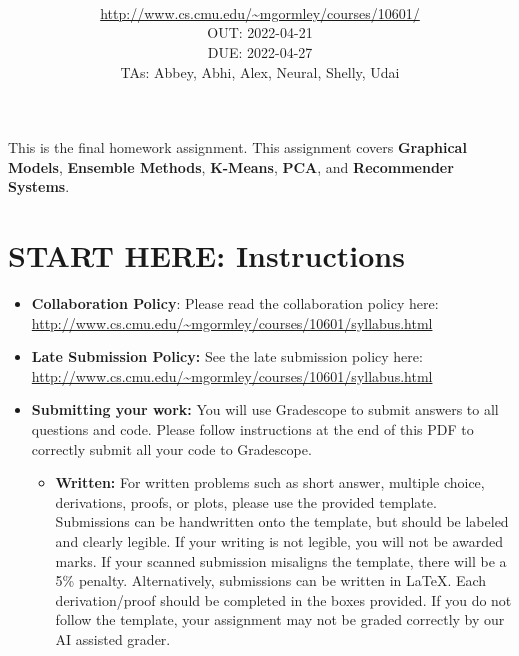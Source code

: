 \documentclass[11pt,addpoints,answers]{exam}
\title{\textsc{\hwName}
} %
\author{\courseName\\
\url{http://www.cs.cmu.edu/~mgormley/courses/10601/} \\
OUT:  2022-04-21 \\
DUE:  2022-04-27 \\ 
TAs: Abbey, Abhi, Alex, Neural, Shelly, Udai
}
\date{}
\date{}
\begin{document}
\maketitle

\begin{notebox}
This is the final homework assignment. This assignment covers \textbf{Graphical Models}, \textbf{Ensemble Methods}, \textbf{K-Means}, \textbf{PCA}, and \textbf{Recommender Systems}.
\end{notebox}
\newcommand \maxsubs {10 }
\section*{START HERE: Instructions}
\begin{itemize}

\item \textbf{Collaboration Policy}: Please read the collaboration policy here: \url{http://www.cs.cmu.edu/~mgormley/courses/10601/syllabus.html}

\item\textbf{Late Submission Policy:} See the late submission policy here: \url{http://www.cs.cmu.edu/~mgormley/courses/10601/syllabus.html}

\item\textbf{Submitting your work:} You will use Gradescope to submit
  answers to all questions and code. Please
  follow instructions at the end of this PDF to correctly submit all your code to Gradescope.

  \begin{itemize}
    

    
   \item \textbf{Written:} For written problems such as short answer, multiple choice, derivations, proofs, or plots, please use the provided template. Submissions can be handwritten onto the template, but should be labeled and clearly legible. If your writing is not legible, you will not be awarded marks. If your scanned submission misaligns the template, there will be a 5\% penalty. Alternatively, submissions can be written in LaTeX. 
   Each derivation/proof should be completed in the boxes provided. If you do not follow the template, your assignment may not be graded correctly by our AI assisted grader.
  \end{itemize}


\end{itemize}
\end{document}
